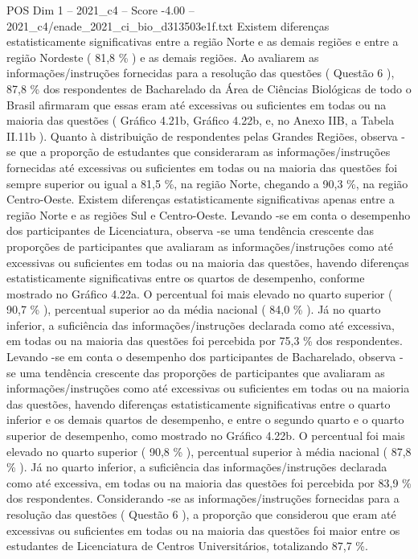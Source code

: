 \begin{textsample}{POS Dim 1 – 2021\_c4 – Score -4.00 – 2021\_c4/enade\_2021\_ci\_bio\_d313503e1f.txt}
Existem diferenças estatisticamente significativas entre a região Norte e as demais regiões e entre a região Nordeste ( 81,8 \% ) e as demais regiões.
Ao avaliarem as informações/instruções fornecidas para a resolução das questões ( Questão 6 ), 87,8 \% dos respondentes de Bacharelado da Área de Ciências Biológicas de todo o Brasil afirmaram que essas eram até excessivas ou suficientes em todas ou na maioria das questões ( Gráfico 4.21b, Gráfico 4.22b, e, no Anexo IIB, a Tabela II.11b ).
Quanto à distribuição de respondentes pelas Grandes Regiões, observa -se que a proporção de estudantes que consideraram as informações/instruções fornecidas até excessivas ou suficientes em todas ou na maioria das questões foi sempre superior ou igual a 81,5 \%, na região Norte, chegando a 90,3 \%, na região Centro-Oeste.
Existem diferenças estatisticamente significativas apenas entre a região Norte e as regiões Sul e Centro-Oeste.
Levando -se em conta o desempenho dos participantes de Licenciatura, observa -se uma tendência crescente das proporções de participantes que avaliaram as informações/instruções como até excessivas ou suficientes em todas ou na maioria das questões, havendo diferenças estatisticamente significativas entre os quartos de desempenho, conforme mostrado no Gráfico 4.22a.
O percentual foi mais elevado no quarto superior ( 90,7 \% ), percentual superior ao da média nacional ( 84,0 \% ).
Já no quarto inferior, a suficiência das informações/instruções declarada como até excessiva, em todas ou na maioria das questões foi percebida por 75,3 \% dos respondentes.
Levando -se em conta o desempenho dos participantes de Bacharelado, observa -se uma tendência crescente das proporções de participantes que avaliaram as informações/instruções como até excessivas ou suficientes em todas ou na maioria das questões, havendo diferenças estatisticamente significativas entre o quarto inferior e os demais quartos de desempenho, e entre o segundo quarto e o quarto superior de desempenho, como mostrado no Gráfico 4.22b.
O percentual foi mais elevado no quarto superior ( 90,8 \% ), percentual superior à média nacional ( 87,8 \% ).
Já no quarto inferior, a suficiência das informações/instruções declarada como até excessiva, em todas ou na maioria das questões foi percebida por 83,9 \% dos respondentes.
Considerando -se as informações/instruções fornecidas para a resolução das questões ( Questão 6 ), a proporção que considerou que eram até excessivas ou suficientes em todas ou na maioria das questões foi maior entre os estudantes de Licenciatura de Centros Universitários, totalizando 87,7 \%.

\end{textsample}
